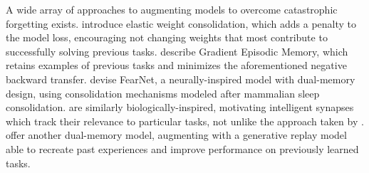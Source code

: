 A wide array of approaches to augmenting models to overcome catastrophic forgetting exists. \textcite{Kirkpatrick2017} introduce elastic weight consolidation, which adds a penalty to the model loss, encouraging not changing weights that most contribute to successfully solving previous tasks. \textcite{Lopez-Paz2017} describe Gradient Episodic Memory, which retains examples of previous tasks and minimizes the aforementioned negative backward transfer. \textcite{Kemker2018} devise FearNet, a neurally-inspired model with dual-memory design, using consolidation mechanisms modeled after mammalian sleep consolidation. \textcite{Zenke2017} are similarly biologically-inspired, motivating intelligent synapses which track their relevance to particular tasks, not unlike the approach taken by \textcite{Kirkpatrick2017}. \textcite{Kamra2017} offer another dual-memory model, augmenting with a generative replay model able to recreate past experiences and improve performance on previously learned tasks. 
